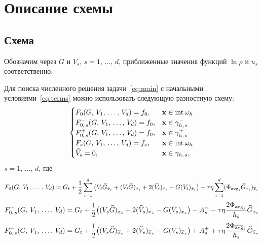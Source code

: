 \section{Описание схемы}

\subsection{Схема}
Обозначим через $G$ и $V_s$, $s = 1, \, \ldots, \, d$,
приближенные значения функций $\ln\rho$ и $u_s$ соответственно.

Для поиска численного решения задачи~\eqref{eq:main} с начальными условиями~\eqref{eq:terms} можно использовать следующую разностную схему:
\begin{equation} 
\label{eq:system}
\begin{cases}
    F_0 (G, \, V_1, \, \ldots, \, V_d) = f_0, & \vec{x} \in \internal \omega_h \\
    F_{0, \, s}^- (G, \, V_1, \, \ldots, \, V_d) = f_0, & \vec{x} \in \gamma_{h, \, s}^- \\
    F_{0, \, s}^+ (G, \, V_1, \, \ldots, \, V_d) = f_0, & \vec{x} \in \gamma_{h, \, s}^+ \\
    F_s (G, \, V_1, \, \ldots, \, V_d) = f_s, & \vec{x} \in \internal \omega_h \\
    \widehat{V}_s = 0, & \vec{x} \in \gamma_{h, \, s},
\end{cases}
\end{equation}
$s = 1, \, \ldots, \, d$, где
%
\begin{equation} 
\label{eq:short_1}
F_0 (G, \, V_1, \, \ldots, \, V_d) = G_t
+ \frac{1}{2} \sum_{i = 1}^{d} 
	\big( V_i \widehat{G}_{\mathring{x}_i} + (V_i \widehat{G})_{\mathring{x}_i} 
		  + 2 (\widehat{V}_i)_{\mathring{x}_i} - G (V_i)_{\mathring{x}_i} 
	\big)
- \tau \eta \sum_{i = 1}^{d} (\Phi_{\operatorname{avg}_i} \widehat{G}_{x_i})_{\overline{x}_i}
\end{equation}
%
\begin{equation} 
\label{eq:short_2}
F_{0, \, s}^- (G, \, V_1, \, \ldots, \, V_d) = G_t 
+ \frac{1}{2} \big( (V_s \widehat{G})_{x_s} + 2 (\widehat{V}_s)_{x_s} - G (V_s)_{x_s} \big)
- A_{s}^- - \tau \eta \frac{2 \Phi_{\operatorname{avg}_s}}{h_s} \widehat{G}_{x_s}
\end{equation}
%
\begin{equation} 
\label{eq:short_3}
F_{0, \, s}^+ (G, \, V_1, \, \ldots, \, V_d) = G_t 
+ \frac{1}{2} \big( (V_s \widehat{G})_{\overline{x}_s} + 2 (\widehat{V}_s)_{\overline{x}_s} - G (V_s)_{\overline{x}_s} \big)
+ A_{s}^+ + \tau \eta \frac{2 \Phi_{\overline{\operatorname{avg}}_s}}{h_s} \widehat{G}_{\overline{x}_s}
\end{equation}
